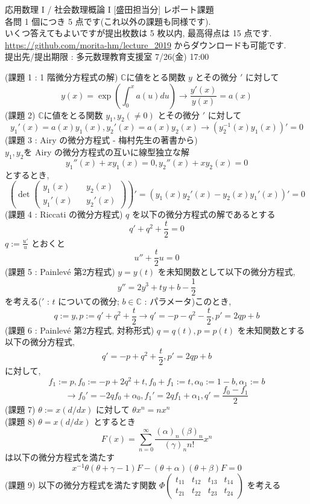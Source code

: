 \documentclass{article}
\begin{document}
\begin{center}
  応用数理 I / 社会数理概論 I [盛田担当分] レポート課題\\
  各問 1 個につき 5 点です(これ以外の課題も同様です). \\
  いくつ答えてもよいですが提出枚数は 5 枚以内, 最高得点は 15 点です. \\
  \url{https://github.com/morita-hm/lecture_2019} からダウンロードも可能です.\\
  提出先/提出期限 : 多元数理教育支援室 7/26(金) 17:00
\end{center}
(課題 1 : 1 階微分方程式の解) $\mathbb{C}$に値をとる関数 $y$ とその微分 $'$ に対して
\[ y(x) = \exp \left(\int^{x}_{0} a(u)du \right) \rightarrow \frac{y'(x)}{y(x)} = a(x) \]
(課題 2) $\mathbb{C}$に値をとる関数 $y_1, y_2 (\neq 0)$ とその微分 $'$ に対して
\[ y_1'(x) = a(x)y_1(x), y_2'(x) = a(x)y_2(x) \rightarrow (y_2^{-1}(x)y_1(x))' = 0 \]
(課題 3 : Airy の微分方程式 - 梅村先生の著書から) \\
$y_1,y_2$を Airy の微分方程式の互いに線型独立な解
\[ y_1''(x) + xy_1(x) = 0, y_2''(x) + xy_2(x) = 0 \]
とするとき,
\[ \left(\det
\begin{pmatrix}
  y_1(x)  && y_2(x) \\
  y_1'(x) && y_2'(x) 
\end{pmatrix}\right)' = (y_1(x)y_2'(x) - y_2(x)y_1'(x))' = 0 \]
(課題 4 : Riccati の微分方程式) $q$ を以下の微分方程式の解であるとする
\[ q' + q^2 + \frac{t}{2} = 0 \]
$q := \frac{u'}{u}$ とおくと
\[ u'' + \frac{t}{2} u = 0 \]
(課題 5 : Painlev\'e 第2方程式) $y=y(t)$ を未知関数として以下の微分方程式, 
\[ y'' = 2y^3 + ty + b - \frac{1}{2} \]
を考える($'$ : $t$ についての微分; $b \in \mathbb{C}$ : パラメータ)このとき,
\[q := y, p := q' + q^2 + \frac{t}{2} \rightarrow q' = -p - q^2 - \frac{t}{2}, p' = 2qp + b \]
(課題 6 : Painlev\'e 第2方程式, 対称形式) $q=q(t),p=p(t)$ を未知関数とする以下の微分方程式, 
\[ q' = -p + q^2 + \frac{t}{2}, p' = 2qp + b \]
に対して,
\[f_1 := p, f_0 := -p + 2q^2 + t, f_0 + f_1 := t, \alpha_0 := 1 - b, \alpha_1 := b \]
\[ \rightarrow f_0' = -2qf_0 + \alpha_0, f_1' = 2qf_1 + \alpha_1, q' = \frac{f_0 - f_1}{2} \]
\newpage \noindent
(課題 7) $\theta := x(d/dx)$ に対して $\theta x^n = n x^n$\\
(課題 8) $\theta = x(d/dx)$ とするとき
\[ F(x) = \sum^{\infty}_{n=0} \frac{(\alpha)_n(\beta)_n}{(\gamma)_n n!} x^n \]
は以下の微分方程式を満たす
\[ x^{-1}\theta(\theta + \gamma - 1)F - (\theta + \alpha)(\theta + \beta)F = 0\]
(課題 9) 以下の微分方程式を満たす関数 $\Phi\begin{pmatrix}
t_{11} & t_{12} & t_{13} & t_{14} \\
t_{21} & t_{22} & t_{23} & t_{24}
\end{pmatrix}$ を考える
\end{document}
